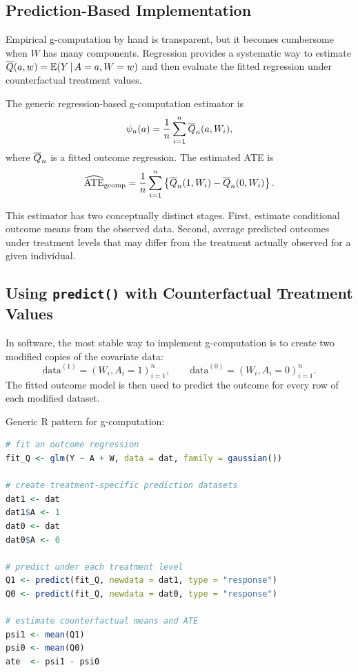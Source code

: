 \label{lec:4-3}

\subsection{Prediction-Based Implementation}

Empirical g-computation by hand is transparent, but it becomes cumbersome when $W$
has many components. Regression provides a systematic way to estimate
$\overline{Q}(a,w)=\mathbb{E}(Y\,\vert\, A=a,W=w)$ and then evaluate the fitted regression under
counterfactual treatment values.

The generic regression-based g-computation estimator is
\[
\psi_n(a)=\frac{1}{n}\sum_{i=1}^n \overline{Q}_n(a,W_i),
\]
where $\overline{Q}_n$ is a fitted outcome regression. The estimated ATE is
\[
\widehat{\operatorname{ATE}}_{\mathrm{gcomp}}
=
\frac{1}{n}\sum_{i=1}^n
\left\{\overline{Q}_n(1,W_i)-\overline{Q}_n(0,W_i)\right\}.
\]

This estimator has two conceptually distinct stages. First, estimate conditional
outcome means from the observed data. Second, average predicted outcomes under
treatment levels that may differ from the treatment actually observed for a given
individual.

\subsection{Using \texttt{predict()} with Counterfactual Treatment Values}

In software, the most stable way to implement g-computation is to create two
modified copies of the covariate data:
\[
\text{data}^{(1)}=(W_i,A_i=1)_{i=1}^n,\qquad
\text{data}^{(0)}=(W_i,A_i=0)_{i=1}^n.
\]
The fitted outcome model is then used to predict the outcome for every row of each
modified dataset.

\begin{implementationbox}
Generic R pattern for g-computation:
\begin{lstlisting}[language=R]
# fit an outcome regression
fit_Q <- glm(Y ~ A + W, data = dat, family = gaussian())

# create treatment-specific prediction datasets
dat1 <- dat
dat1$A <- 1
dat0 <- dat
dat0$A <- 0

# predict under each treatment level
Q1 <- predict(fit_Q, newdata = dat1, type = "response")
Q0 <- predict(fit_Q, newdata = dat0, type = "response")

# estimate counterfactual means and ATE
psi1 <- mean(Q1)
psi0 <- mean(Q0)
ate  <- psi1 - psi0
\end{lstlisting}
\end{implementationbox}

